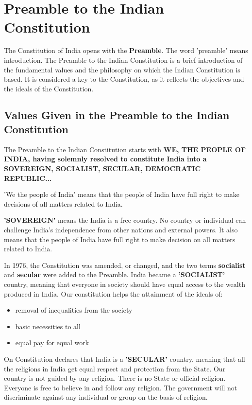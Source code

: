 \section{Preamble to the Indian Constitution}
The Constitution of India opens with the \textbf{Preamble}. The word 'preamble' means introduction. The Preamble to the Indian Constitution is a brief introduction of the fundamental values and the philosophy on which the Indian Constitution is based. It is considered a key to the Constitution, as it reflects the objectives and the ideals of the Constitution.
\subsection{Values Given in the Preamble to the Indian Constitution}
The Preamble to the Indian Constitution starts with \textbf{WE, THE PEOPLE OF INDIA, having solemnly resolved to constitute India into a SOVEREIGN, SOCIALIST, SECULAR, DEMOCRATIC REPUBLIC...}
\vspace{0.1in}
\par
'We the people of India' means that the people of India have full right to make decisions of all matters related to India.
\vspace{0.1in}
\par
\textbf{'SOVEREIGN'} means the India is a free country. No country or individual can challenge India's independence from other nations and external powers. It also means that the people of India have full right to make decision on all matters related to India.
\vspace{0.1in}
\par
In 1976, the Constitution was amended, or changed, and the two terms \textbf{socialist} and \textbf{secular} were added to the Preamble. India became a \textbf{'SOCIALIST'} country, meaning that everyone in society should have equal access to the wealth produced in India. Our constitution helps the attainment of the ideals of:
\begin{itemize}
    \item removal of inequalities from the society
    \item basic necessities to all
    \item equal pay for equal work
\end{itemize}
On Constitution declares that India is a \textbf{'SECULAR'} country, meaning that all the religions in India get equal respect and protection from the State. Our country is not guided by any religion. There is no State or official religion. Everyone is free to believe in and follow any religion. The government will not discriminate against any individual or group on the basis of religion.
